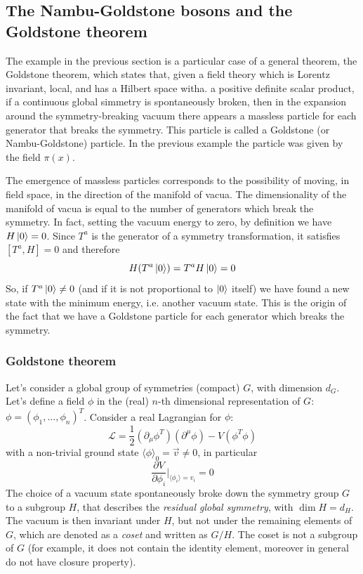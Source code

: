 \documentclass[TheoreticalPhy_ModB.tex]{subfiles}
\begin{document}
\subsection{The Nambu-Goldstone bosons and the Goldstone theorem}

The example in the previous section is a particular case of a general theorem, the Goldstone theorem, which states that, given a field theory which is Lorentz invariant, local, and has a Hilbert space witha. a positive definite scalar product, if a continuous global simmetry is spontaneously broken, then in the expansion around the symmetry-breaking vacuum there appears a massless particle for each generator that breaks the symmetry. This particle is called a Goldstone (or Nambu-Goldstone) particle. In the previous example the particle was given by the field $\pi(x)$.

The emergence of massless particles corresponds to the possibility of moving, in field space, in the direction of the manifold of vacua. The dimensionality of the manifold of vacua is equal to the number of generators which break the symmetry. In fact, setting the vacuum energy to zero, by definition we have $H\ket0=0$. Since $T^a$ is the generator of a symmetry transformation, it satisfies $[T^a,H]=0$ and therefore
\[H(T^a\ket0)=T^aH\ket0=0\]
So, if $T^a\ket0\neq0$ (and if it is not proportional to $\ket0$ itself) we have found a new state with the minimum energy, i.e. another vacuum state. This is the origin of the fact that we have a Goldstone particle for each generator which breaks the symmetry. 

\subsubsection{Goldstone theorem}

Let's consider a global group of symmetries (compact) $G$, with dimension $d_G$. Let's define a field $\phi$ in the (real) $n$-th dimensional representation of $G$: $\phi=(\phi_1,\dots,\phi_n)^T$. Consider a real Lagrangian for $\phi$:
\[\mathcal L=\frac12(\partial_\mu\phi^T)(\partial^\mu\phi)-V(\phi^T\phi)\]
 with a non-trivial ground state $\langle\phi\rangle_0=\vec v\neq0$, in particular
 \[\frac{\partial V}{\partial\phi_i}\bigg\vert_{\langle\phi_i\rangle=v_i}=0\]
The choice of a vacuum state spontaneously broke down the symmetry group $G$ to a subgroup $H$, that describes the \emph{residual global symmetry}, with $\dim H=d_H$. The vacuum is then invariant under $H$, but not under the remaining elements of $G$, which are denoted as a \emph{coset} and written as $G/H$. The coset is not a subgroup of $G$ (for example, it does not contain the identity element, moreover in general do not have closure property). 
\end{document}
